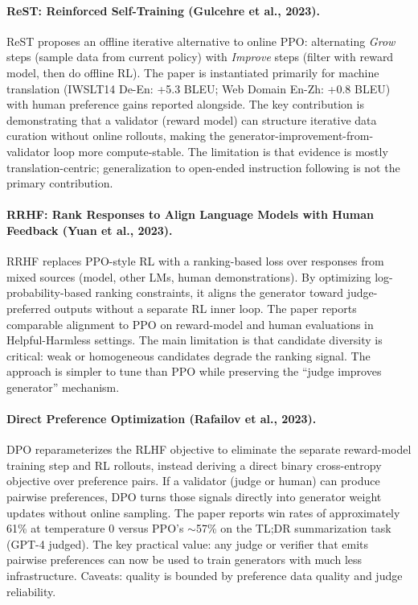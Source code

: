 \documentclass[11pt]{article}
\begin{document}
\paragraph{ReST: Reinforced Self-Training (Gulcehre et al., 2023).}
ReST proposes an offline iterative alternative to online PPO: alternating \emph{Grow} steps (sample data from current policy) with \emph{Improve} steps (filter with reward model, then do offline RL). The paper is instantiated primarily for machine translation (IWSLT14 De-En: +5.3 BLEU; Web Domain En-Zh: +0.8 BLEU) with human preference gains reported alongside. The key contribution is demonstrating that a validator (reward model) can structure iterative data curation without online rollouts, making the generator-improvement-from-validator loop more compute-stable. The limitation is that evidence is mostly translation-centric; generalization to open-ended instruction following is not the primary contribution.

\paragraph{RRHF: Rank Responses to Align Language Models with Human Feedback (Yuan et al., 2023).}
RRHF replaces PPO-style RL with a ranking-based loss over responses from mixed sources (model, other LMs, human demonstrations). By optimizing log-probability-based ranking constraints, it aligns the generator toward judge-preferred outputs without a separate RL inner loop. The paper reports comparable alignment to PPO on reward-model and human evaluations in Helpful-Harmless settings. The main limitation is that candidate diversity is critical: weak or homogeneous candidates degrade the ranking signal. The approach is simpler to tune than PPO while preserving the ``judge improves generator'' mechanism.

\paragraph{Direct Preference Optimization (Rafailov et al., 2023).}
DPO reparameterizes the RLHF objective to eliminate the separate reward-model training step and RL rollouts, instead deriving a direct binary cross-entropy objective over preference pairs. If a validator (judge or human) can produce pairwise preferences, DPO turns those signals directly into generator weight updates without online sampling. The paper reports win rates of approximately 61\% at temperature 0 versus PPO's $\sim$57\% on the TL;DR summarization task (GPT-4 judged). The key practical value: any judge or verifier that emits pairwise preferences can now be used to train generators with much less infrastructure. Caveats: quality is bounded by preference data quality and judge reliability.
\end{document}
